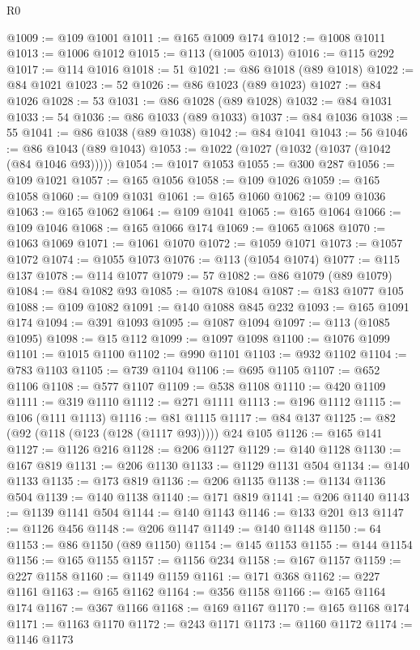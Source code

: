 \begin{lexlean}{R0}
\begin{coremodule}
@1009 := @109 @1001
@1011 := @165 @1009 @174
@1012 := @1008 @1011
@1013 := @1006 @1012
@1015 := @113 (@1005 @1013)
@1016 := @115 @292
@1017 := @114 @1016
@1018 := 51
@1021 := @86 @1018 (@89 @1018)
@1022 := @84 @1021
@1023 := 52
@1026 := @86 @1023 (@89 @1023)
@1027 := @84 @1026
@1028 := 53
@1031 := @86 @1028 (@89 @1028)
@1032 := @84 @1031
@1033 := 54
@1036 := @86 @1033 (@89 @1033)
@1037 := @84 @1036
@1038 := 55
@1041 := @86 @1038 (@89 @1038)
@1042 := @84 @1041
@1043 := 56
@1046 := @86 @1043 (@89 @1043)
@1053 := @1022 (@1027 (@1032 (@1037 (@1042 (@84 @1046 @93)))))
@1054 := @1017 @1053
@1055 := @300 @287
@1056 := @109 @1021
@1057 := @165 @1056
@1058 := @109 @1026
@1059 := @165 @1058
@1060 := @109 @1031
@1061 := @165 @1060
@1062 := @109 @1036
@1063 := @165 @1062
@1064 := @109 @1041
@1065 := @165 @1064
@1066 := @109 @1046
@1068 := @165 @1066 @174
@1069 := @1065 @1068
@1070 := @1063 @1069
@1071 := @1061 @1070
@1072 := @1059 @1071
@1073 := @1057 @1072
@1074 := @1055 @1073
@1076 := @113 (@1054 @1074)
@1077 := @115 @137
@1078 := @114 @1077
@1079 := 57
@1082 := @86 @1079 (@89 @1079)
@1084 := @84 @1082 @93
@1085 := @1078 @1084
@1087 := @183 @1077 @105
@1088 := @109 @1082
@1091 := @140 @1088 @845 @232
@1093 := @165 @1091 @174
@1094 := @391 @1093
@1095 := @1087 @1094
@1097 := @113 (@1085 @1095)
@1098 := @15 @112
@1099 := @1097 @1098
@1100 := @1076 @1099
@1101 := @1015 @1100
@1102 := @990 @1101
@1103 := @932 @1102
@1104 := @783 @1103
@1105 := @739 @1104
@1106 := @695 @1105
@1107 := @652 @1106
@1108 := @577 @1107
@1109 := @538 @1108
@1110 := @420 @1109
@1111 := @319 @1110
@1112 := @271 @1111
@1113 := @196 @1112
@1115 := @106 (@111 @1113)
@1116 := @81 @1115
@1117 := @84 @137
@1125 := @82 (@92 (@118 (@123 (@128 (@1117 @93))))) @24 @105
@1126 := @165 @141
@1127 := @1126 @216
@1128 := @206 @1127
@1129 := @140 @1128
@1130 := @167 @819
@1131 := @206 @1130
@1133 := @1129 @1131 @504
@1134 := @140 @1133
@1135 := @173 @819
@1136 := @206 @1135
@1138 := @1134 @1136 @504
@1139 := @140 @1138
@1140 := @171 @819
@1141 := @206 @1140
@1143 := @1139 @1141 @504
@1144 := @140 @1143
@1146 := @133 @201 @13
@1147 := @1126 @456
@1148 := @206 @1147
@1149 := @140 @1148
@1150 := 64
@1153 := @86 @1150 (@89 @1150)
@1154 := @145 @1153
@1155 := @144 @1154
@1156 := @165 @1155
@1157 := @1156 @234
@1158 := @167 @1157
@1159 := @227 @1158
@1160 := @1149 @1159
@1161 := @171 @368
@1162 := @227 @1161
@1163 := @165 @1162
@1164 := @356 @1158
@1166 := @165 @1164 @174
@1167 := @367 @1166
@1168 := @169 @1167
@1170 := @165 @1168 @174
@1171 := @1163 @1170
@1172 := @243 @1171
@1173 := @1160 @1172
@1174 := @1146 @1173

\end{coremodule}
\end{lexlean}
